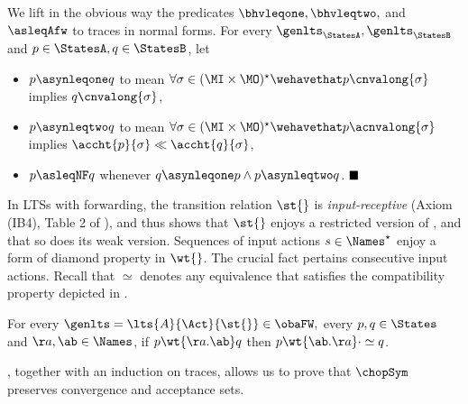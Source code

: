 \begin{definition}%
  \label{def:asyn-leq}%
We lift in the obvious way the predicates $\bhvleqone, \bhvleqtwo, $
and $\asleqAfw$ to traces in normal forms.
For every $\genlts_\StatesA, \genlts_\StatesB$ and $\serverA \in \StatesA,
  \serverB \in \StatesB$, let
\begin{itemize}
  \item 
    $\serverA \asynleqone \serverB$
    to mean 
  $\forall \sigma \in (\MI \times \MO)^\star \wehavethat \serverA \cnvalong{ \sigma }$
    implies $\serverB \cnvalong{ \sigma }$,
    \item 
      $\serverA \asynleqtwo \serverB$ to mean
      $\forall \sigma \in (\MI \times \MO)^\star \wehavethat \serverA \acnvalong{\sigma}$
      implies $\accht{ \serverA }{ \sigma } \ll \accht{ \serverB }{ \sigma }$,
  \item $\serverA \asleqNF \serverB$ whenever
    $\serverB \asynleqone \serverA  \wedge  \serverA \asynleqtwo \serverB$.
    $\hfill\blacksquare$
  \end{itemize}
\end{definition}


In LTSs with forwarding, %
the transition relation $\st{}$ is {\em input-receptive}
(Axiom (IB4), Table 2 of \cite{DBLP:conf/concur/Selinger97}),
and thus  shows that $\st{}$ enjoys a restricted version
of \restrictedinputcommutativity, and that so does its weak version.
Sequences of input actions $s \in \Names^\star$ enjoy a form of
diamond property in $\wt{}$. The crucial fact pertains consecutive input actions. Recall that $\simeq$ denotes any equivalence that satisfies the compatibility property depicted in .


\begin{lemma}%
  \label{lem:weak-a-swap}
  For every $\genlts = \lts{A}{\Act}{\st{}} \in \obaFW,$ every $\serverA, \serverB \in \States$ and $\aa, \ab \in \Names$,
  if $p \wt{\aa.\ab} q$ then $p \wt{\ab.\aa} \cdot \simeq q$.
\end{lemma}

, together with an induction on traces, allows
us to prove that $\chopSym$ preserves convergence and acceptance sets.

